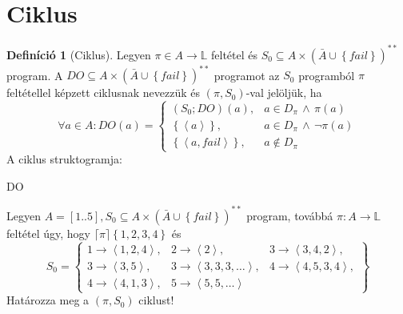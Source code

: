\documentclass[a4paper,12pt]{article}
\theoremstyle{definition}
\newtheorem*{definition*}{Definíció}
\begin{document}
	\section{Ciklus}
		\begin{definition*}[Ciklus]
		Legyen $\pi \in A \rightarrow \mathbb{L}$ feltétel és $S_0 \subseteq A \times \left(\bar{A} \cup \left\{ fail \right\} \right)^{**} $ program. A $DO \subseteq A \times \left(\bar{A} \cup \left\{ fail \right\} \right)^{**} $ programot az $S_0$ programból $\pi$ feltétellel képzett ciklusnak nevezzük és $(\pi, S_0)$-val jelöljük, ha
		\[ \forall a \in A: DO(a) = \begin{cases}
			(S_0;DO)(a), & a \in D_{\pi} \, \land \, \pi(a) \\
			\left\lbrace \left\langle a \right\rangle  \right\rbrace , & a \in D_{\pi} \, \land \, \lnot \pi(a) \\
			\left\lbrace \left\langle a, fail \right\rangle  \right\rbrace,&  a \notin D_{\pi}
		\end{cases}\]
		A ciklus struktogramja:
		\begin{stuki*}[3cm]{DO}
			\begin{WHILE}{1}{\stm{\pi}}
			\end{WHILE}
		\end{stuki*}
	\end{definition*}
	\setcounter{question}{3}
	\begin{question}
		Legyen $A = [1..5], S_0 \subseteq A \times \left(\bar{A} \cup \left\{ fail \right\} \right)^{**}$ program, továbbá $ \pi: A \rightarrow \mathbb{L} $ feltétel úgy, hogy $ \lceil \pi \rceil \left\lbrace 1,2,3,4 \right\rbrace $ és
		\[ S_0 = \left\{ \begin{array}{lll}
			1 \rightarrow \left< 1,2,4 \right>, & 2 \rightarrow \left< 2 \right>,& 3 \rightarrow \left< 3,4,2 \right>, \\
			3 \rightarrow \left< 3,5 \right>,     & 3 \rightarrow \left< 3,3,3,\dots \right>, & 4 \rightarrow \left< 4,5,3,4 \right>, \\
			4 \rightarrow \left< 4,1,3 \right>,     & 5 \rightarrow \left< 5,5,\dots \right> &
		\end{array} \right\} \]
		Határozza meg a $(\pi, S_0)$ ciklust!
	\end{question}
\end{document}
